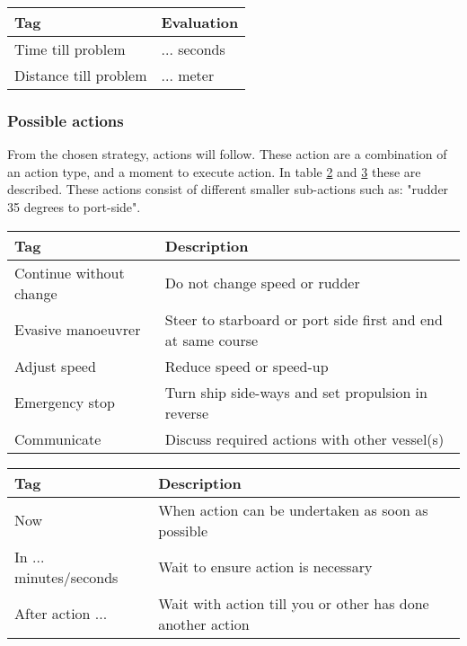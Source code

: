 \begin{table}[H]
	\begin{tabular}{p{}|p{}}
		\toprule
		Tag & Evaluation \\
		\midrule
		Time till problem & ... seconds\\
		Distance till problem & ... meter \\
		\bottomrule
	\end{tabular}
	
	\label{tab:manouvre-criteria}
\end{table}

\subsubsection{Possible actions}
From the chosen strategy, actions will follow. These action are a combination of an action type, and a moment to execute action. In table \ref{tab:actions} and \ref{tab:time-domain-action} these are described. These actions consist of different smaller sub-actions such as: "rudder 35 degrees to port-side". 
\begin{table}[H]
	\begin{tabular}{p{}|p{}}
		\toprule
		Tag & Description\\
		\midrule
		Continue without change & Do not change speed or rudder\\
		Evasive manoeuvrer & Steer to starboard or port side first and end at same course\\
		Adjust speed & Reduce speed or speed-up \\
		Emergency stop & Turn ship side-ways and set propulsion in reverse\\
		Communicate & Discuss required actions with other vessel(s)\\
		\bottomrule
	\end{tabular}
	
	\label{tab:actions}
\end{table}

\begin{table}[H]
	\begin{tabular}{p{}|p{}}
		\toprule
		Tag & Description\\
		\midrule
		Now & When action can be undertaken as soon as possible \\
		In ... minutes/seconds & Wait to ensure action is necessary \\
		After action ... & Wait with action till you or other has done another action \\
		\bottomrule
	\end{tabular}
	
	\label{tab:time-domain-action}
\end{table}

